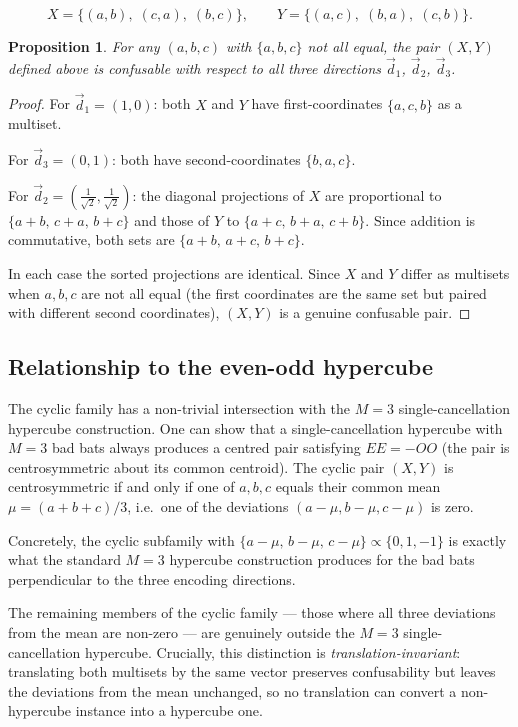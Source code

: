 \documentclass[12pt,a4paper]{article}
\newtheorem{proposition}{Proposition}
\begin{document}
\[
  X = \{(a, b),\; (c, a),\; (b, c)\},
  \qquad
  Y = \{(a, c),\; (b, a),\; (c, b)\}.
\]

\begin{proposition}
  \label{prop:cyclic}
  For any $(a, b, c)$ with $\{a, b, c\}$ not all equal, the pair
  $(X, Y)$ defined above is confusable with respect to all three
  directions $\vec{d}_1$, $\vec{d}_2$, $\vec{d}_3$.
\end{proposition}

\begin{proof}
  For $\vec{d}_1 = (1, 0)$: both $X$ and $Y$ have first-coordinates
  $\{a, c, b\}$ as a multiset.

  For $\vec{d}_3 = (0, 1)$: both have second-coordinates $\{b, a, c\}$.

  For $\vec{d}_2 = (\tfrac{1}{\sqrt{2}}, \tfrac{1}{\sqrt{2}})$: the
  diagonal projections of $X$ are proportional to $\{a+b,\, c+a,\,
  b+c\}$ and those of $Y$ to $\{a+c,\, b+a,\, c+b\}$.  Since addition
  is commutative, both sets are $\{a+b,\, a+c,\, b+c\}$.

  In each case the sorted projections are identical.  Since $X$ and $Y$
  differ as multisets when $a, b, c$ are not all equal (the first
  coordinates are the same set but paired with different second
  coordinates), $(X, Y)$ is a genuine confusable pair.
\end{proof}

\subsection*{Relationship to the even-odd hypercube}

The cyclic family has a non-trivial intersection with the $M = 3$
single-cancellation hypercube construction.  One can show that a
single-cancellation hypercube with $M = 3$ bad bats always produces a
centred pair satisfying $EE = -OO$ (the pair is centrosymmetric about its
common centroid).  The cyclic pair $(X, Y)$ is centrosymmetric if and
only if one of $a, b, c$ equals their common mean $\mu = (a+b+c)/3$,
i.e.\ one of the deviations $(a - \mu, b - \mu, c - \mu)$ is zero.

Concretely, the cyclic subfamily with $\{a - \mu,\, b - \mu,\, c - \mu\}
\propto \{0, 1, -1\}$ is exactly what the standard $M = 3$ hypercube
construction produces for the bad bats perpendicular to the three
encoding directions.

The remaining members of the cyclic family --- those where all three
deviations from the mean are non-zero --- are genuinely outside the $M =
3$ single-cancellation hypercube.  Crucially, this distinction is
\emph{translation-invariant}: translating both multisets by the same
vector preserves confusability but leaves the deviations from the mean
unchanged, so no translation can convert a non-hypercube instance into a
hypercube one.
\end{document}
